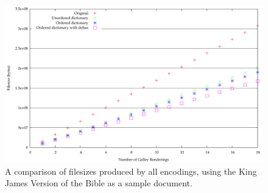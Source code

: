 \begin{figure}
  \begin{center}
  \includegraphics[height=\textwidth,angle=90]{gnuplot/kjv-b}
  \end{center}
  \caption[Comparison of filesizes from all encodings]{A comparison of filesizes produced by all encodings, using the King James Version of the Bible as a sample document.}
  \label{fig:size-all-b}
\end{figure}


